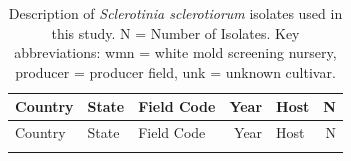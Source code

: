 \documentclass[fleqn,10pt,lineno]{wlpeerj} %
\theoremstyle{definition}
\theoremstyle{definition}
\theoremstyle{definition}
\theoremstyle{remark}
\begin{document}
\setcounter{table}{0} \renewcommand{\thetable}{S\arabic{table}}
\setcounter{figure}{0} \renewcommand{\thefigure}{S\arabic{figure}}

\begin{longtable}[]{@{}lllrlr@{}}
\caption{\label{tab:isolate-table} Description of \emph{Sclerotinia
sclerotiorum} isolates used in this study. N = Number of Isolates. Key
abbreviations: wmn = white mold screening nursery, producer = producer
field, unk = unknown cultivar.}\tabularnewline
\toprule
\begin{minipage}[b]{0.11\columnwidth}\raggedright\strut
Country\strut
\end{minipage} & \begin{minipage}[b]{0.08\columnwidth}\raggedright\strut
State\strut
\end{minipage} & \begin{minipage}[b]{0.12\columnwidth}\raggedright\strut
Field Code\strut
\end{minipage} & \begin{minipage}[b]{0.19\columnwidth}\raggedleft\strut
Year\strut
\end{minipage} & \begin{minipage}[b]{0.29\columnwidth}\raggedright\strut
Host\strut
\end{minipage} & \begin{minipage}[b]{0.04\columnwidth}\raggedleft\strut
N\strut
\end{minipage}\tabularnewline
\midrule
\endfirsthead
\toprule
\begin{minipage}[b]{0.11\columnwidth}\raggedright\strut
Country\strut
\end{minipage} & \begin{minipage}[b]{0.08\columnwidth}\raggedright\strut
State\strut
\end{minipage} & \begin{minipage}[b]{0.12\columnwidth}\raggedright\strut
Field Code\strut
\end{minipage} & \begin{minipage}[b]{0.19\columnwidth}\raggedleft\strut
Year\strut
\end{minipage} & \begin{minipage}[b]{0.29\columnwidth}\raggedright\strut
Host\strut
\end{minipage} & \begin{minipage}[b]{0.04\columnwidth}\raggedleft\strut
N\strut
\end{minipage}\tabularnewline
\midrule
\endhead
\begin{minipage}[t]{0.11\columnwidth}\raggedright\strut

\end{minipage}
\end{longtable}
\end{document}
